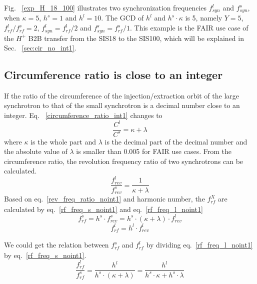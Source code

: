 Fig. ~\ref{exp_H_18_100} illustrates two synchronization frequencies $f_{\mathit{syn}}^{l}$ and $f_{\mathit{syn}}^{s}$, when $\kappa=5$, $h^s=1$ and $h^l=10$. The GCD of $h^l$ and $h^s \cdot \kappa$ is 5, namely $Y=5$, $f_{\mathit{rf}}^{l}/f_{\mathit{rf}}^{s}=2$, $f_{\mathit{syn}}^{l}=f_{\mathit{rf}}^{l}/2$ and $f_{\mathit{syn}}^{s}=f_{\mathit{rf}}^{s}/1$. This example is the FAIR use case of the $H^{+}$ B2B transfer from the SIS18 to the SIS100, which will be explained in Sec. ~\ref{sec:cir_no_int1}.


\subsection{Circumference ratio is close to an integer}
\label{sec:cir_close_an_int}
If the ratio of the circumference of the injection/extraction orbit of the large synchrotron to that of the small synchrotron is a decimal number close to an integer. Eq. ~\ref{circumference_ratio_int1} changes to 
\begin{equation}
\frac{C^l}{C^s}= \kappa + \lambda \label{circumference_ratio_noint0}
\end{equation}
where $\kappa$ is the whole part and $\lambda$ is the decimal part of the decimal number and the absolute value of $\lambda$ is smaller than 0.005 for FAIR use cases. From the circumference ratio, the revolution frequency ratio of two synchrotrons can be calculated.
\begin{equation}
\frac{f_{\mathit{rev}}^{l}}{f_{\mathit{rev}}^{s}}=\frac{1}{ \kappa+ \lambda} \label{rev_freq_ratio_noint1}
\end{equation}
Based on eq.~\ref{rev_freq_ratio_noint1} and harmonic number, the $f_{\mathit{rf}}^{X}$ are calculated by eq.~\ref{rf_freq_s_noint1} and eq.~\ref{rf_freq_l_noint1}
\begin{equation} 
f_{\mathit{rf}}^{s}= h^s \cdot f_{\mathit{rev}}^{s}=h^s \cdot ( \kappa+ \lambda) \cdot f_{\mathit{rev}}^{l} \label{rf_freq_s_noint1}
\end{equation}
\begin{equation} 
f_{\mathit{rf}}^{l}= h^l \cdot f_{\mathit{rev}}^{l} \label{rf_freq_l_noint1}
\end{equation}

We could get the relation between $f_{\mathit{rf}}^{s}$ and $f_{\mathit{rf}}^{l}$ by dividing eq.~\ref{rf_freq_l_noint1} by eq.~\ref{rf_freq_s_noint1}.
\begin{equation} 
\frac{f_{\mathit{rf}}^{l}}{f_{\mathit{rf}}^{s}}=\frac{h^l}{h^s \cdot ( \kappa+ \lambda)}=\frac{h^l}{h^s \cdot  \kappa+ h^s \cdot \lambda}\label{close_to_interger_31}
\end{equation}

